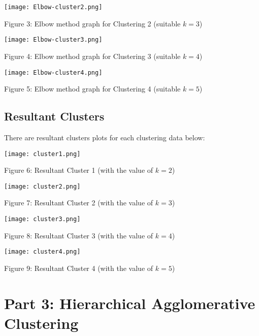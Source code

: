 \documentclass{article}
\begin{document}
\begin{figure3}
    \centering
    \texttt{[image: Elbow-cluster2.png]}
    \caption{Figure 3: Elbow method graph for Clustering 2 (suitable $k=3$)}
    \label{fig:fig3}
\end{figure3}

\begin{figure4}
    \centering
    \texttt{[image: Elbow-cluster3.png]}
    \caption{Figure 4: Elbow method graph for Clustering 3 (suitable $k=4$)}
    \label{fig:fig4}
\end{figure4}

\begin{figure5}
    \centering
    \texttt{[image: Elbow-cluster4.png]}
    \caption{Figure 5: Elbow method graph for Clustering 4 (suitable $k=5$)}
    \label{fig:fig5}
\end{figure5}
\subsection{Resultant Clusters}
There are resultant clusters plots for each clustering data below:

\begin{figure6}
    \centering
    \texttt{[image: cluster1.png]}
    \caption{Figure 6: Resultant Cluster 1 (with the value of $k=2$)}
    \label{fig:fig6}
\end{figure6}

\begin{figure7}
    \centering
    \texttt{[image: cluster2.png]}
    \caption{Figure 7: Resultant Cluster 2 (with the value of $k=3$)}
    \label{fig:fig7}
\end{figure7}

\begin{figure8}
    \centering
    \texttt{[image: cluster3.png]}
    \caption{Figure 8: Resultant Cluster 3 (with the value of $k=4$)}
    \label{fig:fig8}
\end{figure8}

\begin{figure9}
    \centering
    \texttt{[image: cluster4.png]}
    \caption{Figure 9: Resultant Cluster 4 (with the value of $k=5$)}
    \label{fig:fig9}
\end{figure9}

\maketitle
\section{Part 3: Hierarchical Agglomerative Clustering}
\end{document}
